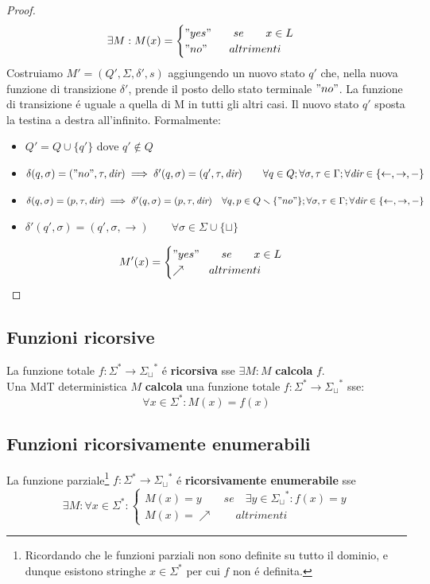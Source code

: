 \begin{proof}
\[\exists M :  M(x) =
\begin{cases}
	"yes" \qquad se \qquad x \in L \\
	"no" \qquad altrimenti
\end{cases}
\]
Costruiamo $M' = (Q', \Sigma, \delta', s)$ aggiungendo un nuovo stato $q'$ che, nella nuova funzione di transizione $\delta'$, prende il posto dello stato terminale $"no"$. La funzione di transizione é uguale a quella di M in tutti gli altri casi. Il nuovo stato $q'$ sposta la testina a destra all'infinito. Formalmente:
\begin{itemize}
	\item $Q' = Q \cup \{q'\}$ \quad dove \quad $q' \notin Q$
	\item $\delta(q, \sigma) = ("no",  \tau, \textit{dir}) \implies \delta'(q, \sigma) = (q', \tau, \textit{dir})  \qquad \forall q \in Q;  \forall \sigma, \tau \in \Gamma;  \forall \textit{dir} \in \{\leftarrow, \rightarrow, -\}$
	\item $\delta(q, \sigma) = (p,  \tau, \textit{dir}) \implies \delta'(q, \sigma) = (p, \tau, \textit{dir})  \quad \forall q, p \in Q \smallsetminus \{"no"\};  \forall \sigma, \tau \in \Gamma;  \forall \textit{dir} \in \{\leftarrow, \rightarrow, -\}$
	\item $\delta'(q', \sigma) = (q', \sigma, \rightarrow) \qquad \forall \sigma \in \Sigma \cup \{\sqcup\}$
\end{itemize}
\[M'(x) =
\begin{cases}
	"yes" \qquad se \qquad x \in L \\
	\nearrow \qquad altrimenti
\end{cases}
\]
\end{proof}


\subsection{Funzioni ricorsive}
La funzione totale $f : \Sigma^* \rightarrow {\Sigma_\sqcup}^*$ é \textbf{ricorsiva} sse $\exists M : M$ \textbf{calcola} $f$. \\
Una MdT deterministica $M$ \textbf{calcola} una funzione totale $f : \Sigma^* \rightarrow {\Sigma_\sqcup}^*$ sse:
\[\forall x \in \Sigma^* : M(x) = f(x) \]


\subsection{Funzioni ricorsivamente enumerabili}
La funzione parziale\footnote{Ricordando che le funzioni parziali non sono definite su tutto il dominio, e dunque esistono stringhe $x \in \Sigma^*$ per cui $f$ non é definita.}  $f : \Sigma^* \rightarrow {\Sigma_\sqcup}^*$ é \textbf{ricorsivamente enumerabile} sse \[\exists M :  \forall x \in \Sigma^* : \begin{cases}
	M(x) = y \qquad se \quad \exists y \in {\Sigma_\sqcup}^* : f(x) = y \\
	M(x) = \nearrow \qquad altrimenti
\end{cases}
\]


